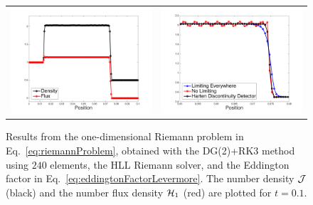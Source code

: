 \documentclass[10pt,preprint]{aastex}
\begin{document}
\begin{figure}
  \begin{center}
    \begin{tabular}{cc}
      \includegraphics[scale=0.4]{./Figures/RiemannProblem1D} &
      \includegraphics[scale=0.4]{./Figures/RiemannProblem1D_Limiters}
    \end{tabular}
  \end{center}
  \caption{Results from the one-dimensional Riemann problem in Eq.~\eqref{eq:riemannProblem}, obtained with the DG(2)+RK3 method using $240$ elements, the HLL Riemann solver, and the Eddington factor in Eq.~\eqref{eq:eddingtonFactorLevermore}.  
  The number density $\mathcal{J}$ (black) and the number flux density $\mathcal{H}_{1}$ (red) are plotted for $t=0.1$.}
  \label{fig:riemannProblem}
\end{figure}
\end{document}
